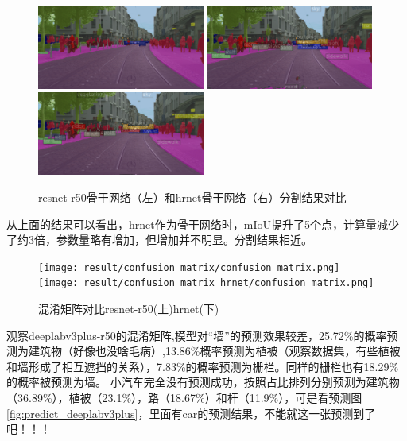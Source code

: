 \documentclass[12pt]{ctexart}
\begin{document}
\begin{figure}[H]
    \includegraphics[width=0.49\textwidth]{result/plot/result_1_deeplabv3plus_hrnet.jpg}
    \includegraphics[width=0.49\textwidth]{result/plot/predict_1_deeplabv3plus.jpg}
    \includegraphics[width=0.49\textwidth]{result/plot/predict_deeplabv3plus_hrnet.jpg}
    \caption{resnet-r50骨干网络（左）和hrnet骨干网络（右）分割结果对比}
    \label{fig:res_hrnet_compare}
\end{figure}
从上面的结果可以看出，hrnet作为骨干网络时，mIoU提升了5个点，计算量减少了约3倍，参数量略有增加，但增加并不明显。分割结果相近。


\begin{figure}[H]  %
    \centering        %
    \texttt{[image: result/confusion\_matrix/confusion\_matrix.png]}
    \texttt{[image: result/confusion\_matrix\_hrnet/confusion\_matrix.png]}
    \caption{混淆矩阵对比resnet-r50(上)hrnet(下)}
    \label{fig:confusion_matrix_compare}
\end{figure}
观察deeplabv3plus-r50的混淆矩阵,模型对“墙”的预测效果较差，25.72\%的概率预测为建筑物（好像也没啥毛病）,13.86\%概率预测为植被（观察数据集，有些植被和墙形成了相互遮挡的关系），7.83\%的概率预测为栅栏。同样的栅栏也有18.29\%的概率被预测为墙。
小汽车完全没有预测成功，按照占比排列分别预测为建筑物（36.89\%），植被（23.1\%），路（18.67\%）和杆（11.9\%），可是看预测图\ref{fig:predict_deeplabv3plus}，里面有car的预测结果，不能就这一张预测到了吧！！！
\end{document}
